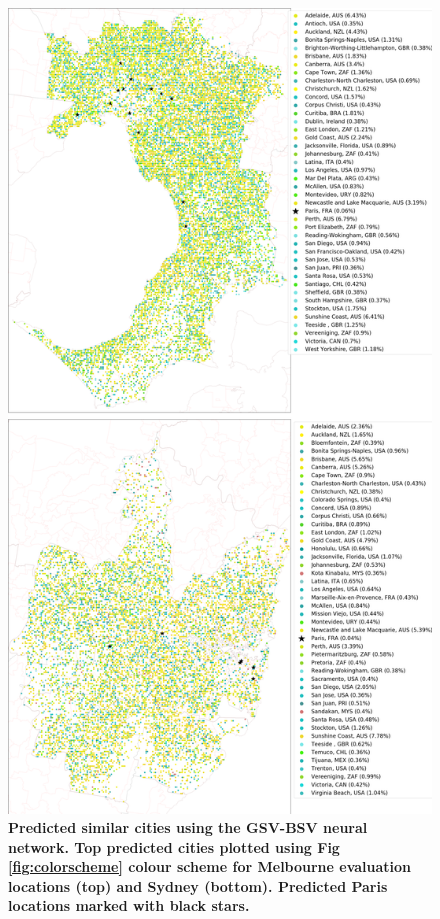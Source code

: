 \documentclass[Crown,sageh,times]{sagej}
\begin{document}
\begin{figure}[!htbp]
\centering    
\includegraphics[scale=0.16]{Images/PlosOne/Fig9.png} 
\caption{\bf Predicted similar cities using the GSV-BSV neural network. Top predicted cities plotted using Fig \ref{fig:colorscheme} colour scheme for Melbourne evaluation locations (top) and Sydney (bottom). Predicted Paris locations marked with black stars.}   
 \label{fig:melstreet}  
\end{figure}
\end{document}
